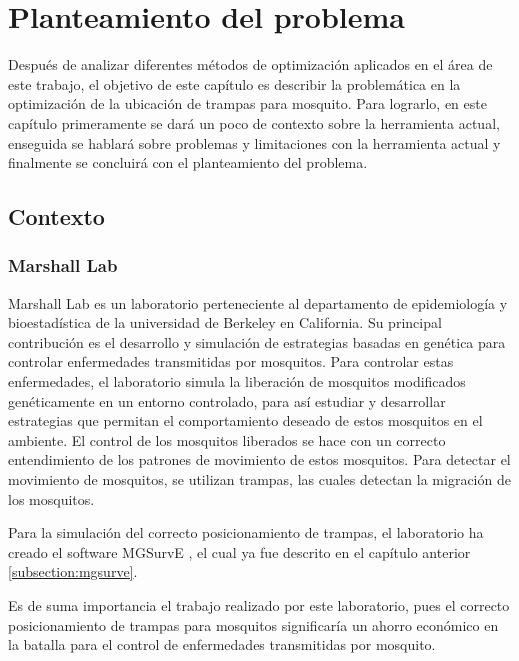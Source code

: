 \documentclass[letterpaper]{report}
\begin{document}
\chapter{Planteamiento del problema}\label{chap:planteaminto}
  Después de analizar diferentes métodos de optimización aplicados en el área de
  este trabajo, el objetivo de este capítulo es describir la problemática en
  la optimización de la ubicación de trampas para mosquito. Para lograrlo, en
  este 
  capítulo primeramente se dará un poco de contexto sobre la herramienta actual,
  enseguida se hablará sobre problemas y limitaciones con la herramienta actual
  y finalmente se concluirá con el planteamiento del problema.

  \section{Contexto}
    \subsection{Marshall Lab}
    Marshall Lab \cite{MarshallLab} es un laboratorio perteneciente al
    departamento de epidemiología y bioestadística de la universidad de Berkeley
    en California. Su principal contribución es el desarrollo y simulación de
    estrategias basadas en genética para controlar enfermedades transmitidas por
    mosquitos. Para controlar estas enfermedades, el laboratorio simula la
    liberación de mosquitos modificados genéticamente en un entorno controlado,
    para así estudiar y desarrollar estrategias que permitan el comportamiento
    deseado de estos mosquitos en el ambiente. El control de los mosquitos
    liberados se hace con un correcto entendimiento de los patrones de
    movimiento de estos mosquitos. Para detectar el movimiento de mosquitos, se
    utilizan trampas, las cuales detectan la migración de los mosquitos.

    Para la simulación del correcto posicionamiento de trampas, el laboratorio
    ha creado el software MGSurvE \cite{MGSurvE}, el cual ya fue descrito en el
    capítulo anterior \ref{subsection:mgsurve}.

    Es de suma importancia el trabajo realizado por este laboratorio, pues el
    correcto posicionamiento de trampas para mosquitos significaría un ahorro
    económico en la batalla para el control de enfermedades transmitidas por
    mosquito.
\end{document}
